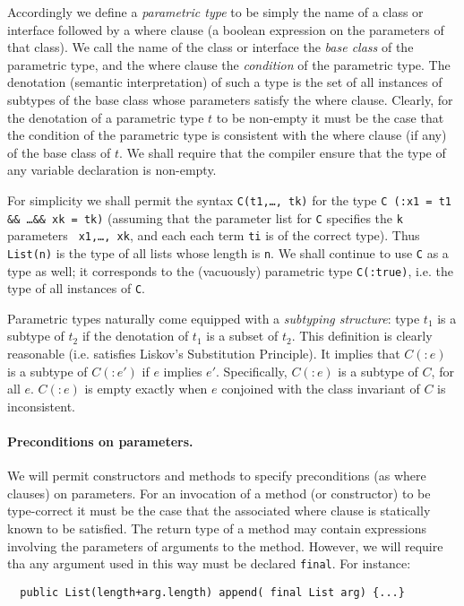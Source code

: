 \documentclass{article}
\begin{document}
Accordingly we define a {\em parametric type} to be simply the name of
a class or interface followed by a where clause (a boolean expression
on the parameters of that class). We call the name of the class or
interface the {\em base class} of the parametric type, and the where
clause the {\em condition} of the parametric type. The denotation
(semantic interpretation) of such a type is the set of all instances
of subtypes of the base class whose parameters satisfy the where
clause. Clearly, for the denotation of a parametric type $t$ to be
non-empty it must be the case that the condition of the parametric
type is consistent with the where clause (if any) of the base class of
$t$. We shall require that the compiler ensure that the type of any
variable declaration is non-empty.  

For simplicity we shall permit the syntax {\tt C(t1,\ldots, tk)} for
the type {\tt C (:x1 = t1 \&\& \ldots \&\& xk = tk)} (assuming that
the parameter list for {\tt C} specifies the {\tt k} parameters {\tt
x1,\ldots, xk}, and each each term {\tt ti} is of the correct
type). Thus {\tt List(n)} is the type of all lists whose length is
{\tt n}. We shall continue to use {\tt C} as a type as well; it
corresponds to the (vacuously) parametric type {\tt C(:true)}, i.e.{}
the type of all instances of {\tt C}.

Parametric types naturally come equipped with a {\em subtyping
structure}: type $t_1$ is a subtype of $t_2$ if the denotation of
$t_1$ is a subset of $t_2$. This definition is clearly reasonable
(i.e.{} satisfies Liskov's Substitution Principle).  It implies that
$C(:e)$ is a subtype of $C(:e')$ if $e$ implies $e'$.  Specifically,
$C(:e)$ is a subtype of $C$, for all $e$.  $C(:e)$ is empty exactly
when $e$ conjoined with the class invariant of $C$ is inconsistent.

\paragraph{Preconditions on parameters.}
We will permit constructors and methods to specify preconditions (as
where clauses) on parameters. For an invocation of a method (or
constructor) to be type-correct it must be the case that the
associated where clause is statically known to be satisfied. The
return type of a method may contain expressions involving the
parameters of arguments to the method. However, we will require
tha any argument used in this way must be declared {\tt final}. 
For instance:

{\footnotesize
\begin{verbatim}
  public List(length+arg.length) append( final List arg) {...}
\end{verbatim}}
\end{document}
